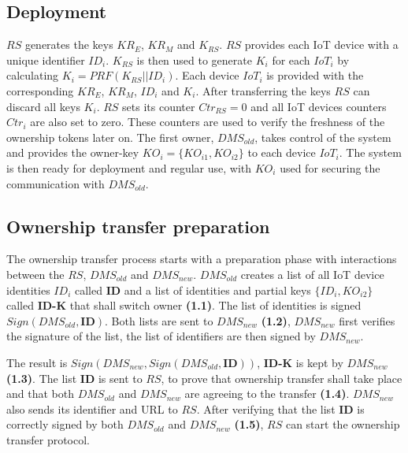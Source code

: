 {\subsection{Deployment}


$RS$ generates the keys $KR_E$, $KR_M$ and $K_{RS}$. $RS$ provides each IoT device with a unique identifier $ID_i$. $K_{RS}$ is then used to generate $K_i$ for each $IoT_i$ by calculating $K_i = PRF(K_{RS} || ID_i)$. Each device $IoT_i$ is provided with the corresponding $KR_E$, $KR_M$, $ID_i$ and $K_i$. After transferring the keys $RS$ can discard all keys $K_i$. $RS$ sets its counter $Ctr_{RS} = 0$ and all IoT devices counters $Ctr_i$ are also set to zero. These counters are used to verify the freshness of the ownership tokens later on.
The first owner, $DMS_{old}$, takes control of the system and provides the owner-key $KO_i = \{KO_{i1}, KO_{i2}\}$ to each device $IoT_i$. The system is then ready for deployment and regular use, with $KO_i$ used for securing the communication with $DMS_{old}$. 

\subsection{Ownership transfer preparation}
The ownership transfer process starts with a preparation phase with interactions between the $RS$, $DMS_{old}$ and $DMS_{new}$. $DMS_{old}$ creates a list of all IoT device identities $ID_i$ called \textbf{ID} and a list of identities and partial keys $\{ID_i, KO_{i2} \}$ called \textbf{ID-K} that shall switch owner \textbf{(1.1)}. The list of identities is signed $Sign(DMS_{old}, \mathbf{ID})$.
Both lists are sent to $DMS_{new}$ \textbf{(1.2)}, $DMS_{new}$ first verifies the signature of the list, the list of identifiers are then signed by $DMS_{new}$. 

The result is $Sign(DMS_{new}, Sign(DMS_{old}, \mathbf{ID}))$, \textbf{ID-K} is kept by $DMS_{new}$ \textbf{(1.3)}. The list \textbf{ID} is sent to $RS$, to prove that ownership transfer shall take place and that both $DMS_{old}$ and $DMS_{new}$ are agreeing to the transfer \textbf{(1.4)}. $DMS_{new}$ also sends its identifier and URL to $RS$.
After verifying that the list \textbf{ID} is correctly signed by both $DMS_{old}$ and $DMS_{new}$ \textbf{(1.5)}, $RS$ can start the ownership transfer protocol. 

}
